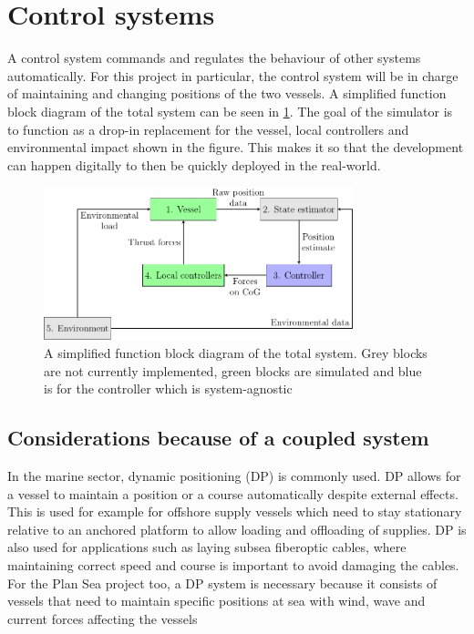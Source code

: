 \documentclass[class=article, crop=false]{standalone}
\begin{document}
\section{Control systems}
A control system commands and regulates the behaviour of other systems automatically. For this project in particular, the control system will be in charge of maintaining and changing positions of the two vessels. A simplified function block diagram of the total system can be seen in \cref{fig:fbd}. The goal of the simulator is to function as a drop-in replacement for the vessel, local controllers and environmental impact shown in the figure. This makes it so that the development can happen digitally to then be quickly deployed in the real-world.

\begin{figure}
	\centering
	\includegraphics[width=0.8\textwidth]{control-fbd}
	\caption{A simplified function block diagram of the total system. Grey blocks are not currently implemented, green blocks are simulated and blue is for the controller which is system-agnostic}
	\label{fig:fbd}
\end{figure}


\subsection{Considerations because of a coupled system}
In the marine sector, dynamic positioning (DP) is commonly used. DP allows for a vessel to maintain a position or a course automatically despite external effects. This is used for example for offshore supply vessels which need to stay stationary relative to an anchored platform to allow loading and offloading of supplies. DP is also used for applications such as laying subsea fiberoptic cables, where maintaining correct speed and course is important to avoid damaging the cables. For the Plan Sea project too, a DP system is necessary because it consists of vessels that need to maintain specific positions at sea with wind, wave and current forces affecting the vessels
\end{document}
